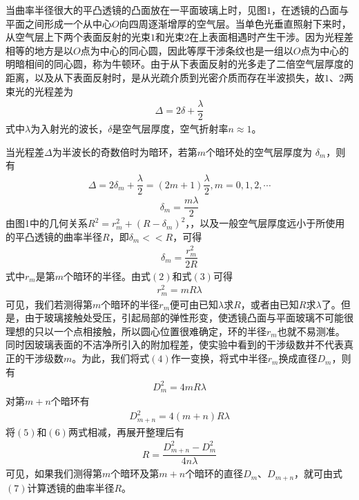 \documentclass[11pt]{article}
\begin{document}
当曲率半径很大的平凸透镜的凸面放在一平面玻璃上时，见图$1$，在透镜的凸面与平面之间形成一个从中心$O$向四周逐渐增厚的空气层。当单色光垂直照射下来时，从空气层上下两个表面反射的光束$1$和光束$2$在上表面相遇时产生干涉。因为光程差相等的地方是以$O$点为中心的同心圆，因此等厚干涉条纹也是一组以$O$点为中心的明暗相间的同心圆，称为牛顿环。由于从下表面反射的光多走了二倍空气层厚度的距离，以及从下表面反射时，是从光疏介质到光密介质而存在半波损失，故$1$、$2$两束光的光程差为
\begin{align}
    \Delta=2\delta+\dfrac{\lambda}{2}
\end{align}
式中$\lambda$为入射光的波长，$\delta$是空气层厚度，空气折射率$n\approx1$。

当光程差$\Delta$为半波长的奇数倍时为暗环，若第$m$个暗环处的空气层厚度为 $\delta_m$，则有
\begin{align}
    \Delta=2\delta_m+\dfrac{\lambda}{2}=(2m+1)\dfrac{\lambda}{2},m=0,1,2,\cdots
\end{align}
$$
\delta_m=\dfrac{m\lambda}{2}
$$
由图1中的几何关系$R^2=r_m^2+(R-\delta_m)^2$，，以及一般空气层厚度远小于所使用的平凸透镜的曲率半径$R$，即$\delta_m<<R$，可得
\begin{align}
    \delta_m=\dfrac{r_m^2}{2R}
\end{align}
式中$r_m$是第$m$个暗环的半径。由式$(2)$和式$(3)$可得
\begin{align}
    r_m^2=mR\lambda
\end{align}
可见，我们若测得第$m$个暗环的半径$r_m$便可由已知$\lambda$求$R$，或者由已知$R$求$\lambda$了。但是，由于玻璃接触处受压，引起局部的弹性形变，使透镜凸面与平面玻璃不可能很理想的只以一个点相接触，所以圆心位置很难确定，环的半径$r_m$也就不易测准。同时因玻璃表面的不洁净所引入的附加程差，使实验中看到的干涉级数并不代表真正的干涉级数$m$。为此，我们将式$(4)$作一变换，将式中半径$r_m$换成直径$D_m$，则有
\begin{align}
    D_m^2=4mR\lambda
\end{align}
对第$m+n$个暗环有
\begin{align}
    D_{m+n}^2=4(m+n)R\lambda
\end{align}
将$(5)$和$(6)$两式相减，再展开整理后有
\begin{align}
    R=\dfrac{D_{m+n}^2-D_m^2}{4n\lambda}
\end{align}
可见，如果我们测得第$m$个暗环及第$m+n$个暗环的直径$D_m$、$D_{m+n}$，就可由式$(7)$计算透镜的曲率半径$R$。
\end{document}
